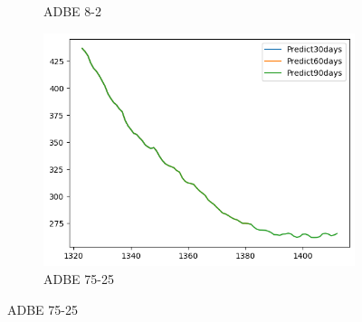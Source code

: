 \documentclass{ieeeojies}
\begin{document}
\begin{figure}[H]
\begin{subfigure}[b]{0.33\linewidth}
        \caption{ADBE 8-2}
        \label{fig:adbe-8-2}
    \end{subfigure}%
    \hfill
    \begin{subfigure}[b]{0.33\linewidth}
        \centering
        \includegraphics[width=\linewidth]{RNN Plot/RNN_ADBE_72_25_90.png}
        \caption{ADBE 75-25}
        \label{fig:adbe-75-25}
    \end{subfigure}
\end{figure}
\vspace{-20pt}
\end{document}
